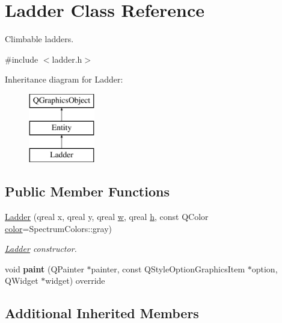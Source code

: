\hypertarget{class_ladder}{}\section{Ladder Class Reference}
\label{class_ladder}


Climbable ladders.  




{\ttfamily \#include $<$ladder.\+h$>$}

Inheritance diagram for Ladder\+:\begin{figure}[H]
\begin{center}
\leavevmode
\includegraphics[height=3.000000cm]{class_ladder}
\end{center}
\end{figure}
\subsection*{Public Member Functions}
\begin{DoxyCompactItemize}
\item 
\hyperlink{class_ladder_a876d8ac53c8ef33eb79372b99da2cf82}{Ladder} (qreal x, qreal y, qreal \hyperlink{class_entity_a351a26475f8c124429a638483e95fa8e}{w}, qreal \hyperlink{class_entity_a639fea375adab80851778acb51757fb8}{h}, const Q\+Color \hyperlink{class_entity_ad14bf88ca550e2e5b13438a3faf545e6}{color}=Spectrum\+Colors\+::gray)
\begin{DoxyCompactList}\small\item\em \hyperlink{class_ladder}{Ladder} constructor. \end{DoxyCompactList}\item 
\mbox{\label{class_ladder_a025f3bdef34c744edebccb0efae4356c}} 
void {\bfseries paint} (Q\+Painter $\ast$painter, const Q\+Style\+Option\+Graphics\+Item $\ast$option, Q\+Widget $\ast$widget) override
\end{DoxyCompactItemize}
\subsection*{Additional Inherited Members}


